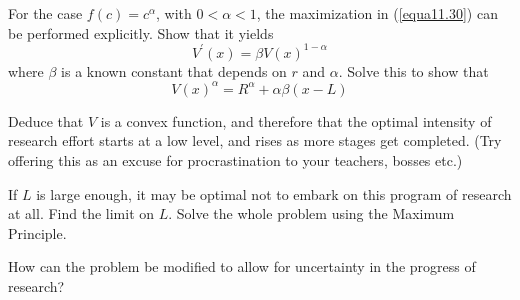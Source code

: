 For the case $f(c) = c^\alpha$, with $0<\alpha <1$, the maximization in (\ref{equa11.30}) can be performed explicitly. Show that it yields
\begin{equation*}
   V^\prime(x) = \beta V(x)^{1-\alpha}
\end{equation*}
where $\beta$ is a known constant that depends on $r$ and $\alpha$. Solve this to show that
\begin{equation} \label{equa11.31}
  V(x)^\alpha = R^\alpha + \alpha \beta (x-L)
\end{equation}

Deduce that $V$ is a convex function, and therefore that the optimal intensity of research effort starts at a low level, and rises as more stages get completed. (Try offering this as an excuse for procrastination to your teachers, bosses etc.)

If $L$ is large enough, it may be optimal not to embark on this program of research at all. Find the limit on $L$. Solve the whole problem using the Maximum Principle.

How can the problem be modified to allow for uncertainty in the progress of research?








